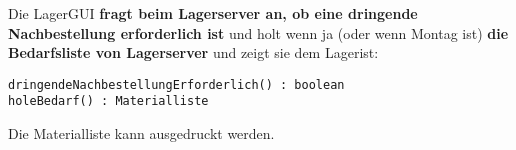 Die LagerGUI \textbf{fragt beim Lagerserver an, ob eine dringende Nachbestellung erforderlich ist} und holt wenn ja (oder wenn Montag ist) \textbf{die Bedarfsliste von Lagerserver} und zeigt sie dem Lagerist:

\texttt{dringendeNachbestellungErforderlich() : boolean} \\
\texttt{holeBedarf() : Materialliste}

Die Materialliste kann ausgedruckt werden.